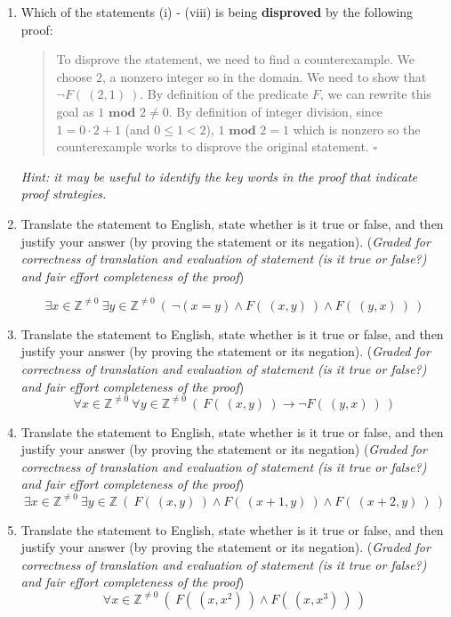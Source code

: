 \begin{enumerate}[labelindent=0pt, leftmargin=0pt]
\begin{enumerate}
    \item
    Which of the statements (i) - (viii) is being {\bf disproved} by the following proof:
    
    \begin{quote}
      To disprove the statement, we need to find a counterexample. We choose $2$, a nonzero
      integer so in the domain. We need to show that $\lnot F(~(2,1)~)$. By definition of the predicate $F$, we 
      can rewrite this goal as $1 \textbf{ mod } 2 \neq 0$. By definition of integer division, since 
      $1 = 0 \cdot 2  + 1$ (and $0 \leq 1 < 2$), $1 \textbf { mod } 2 = 1$ which is nonzero so the counterexample works to 
      disprove the original statement.
       $\square$
    \end{quote}
    
    {\it Hint: it may be useful to 
    identify the key words in the proof that indicate proof strategies.}
    
    \item 
    Translate the statement to English, state whether is it true or false, and then justify your answer (by proving the statement or its negation).
({\it Graded for correctness of translation and evaluation of statement (is it true or false?) 
    and fair effort completeness of the proof}) 

    $$\exists x \in \mathbb{Z}^{\neq 0}~ \exists y \in \mathbb{Z}^{\neq 0} ~(~\lnot(x = y) \land F(~(x,y)~) \land F(~(y,x)~)~)$$
    
    \item 
    Translate the statement to English, state whether is it true or false, and then justify your answer (by proving the statement or its negation).
    ({\it Graded for correctness of translation and evaluation of statement (is it true or false?) 
    and fair effort completeness of the proof}) 
    $$\forall x \in \mathbb{Z}^{\neq 0}~ \forall y \in \mathbb{Z}^{\neq 0} ~(~F(~(x,y)~) \to \lnot F(~(y,x)~)~)$$
    
    \item 
    Translate the statement to English, state whether is it true or false, and then justify your answer (by proving the statement or its negation)
    ({\it Graded for correctness of translation and evaluation of statement (is it true or false?) 
    and fair effort completeness of the proof}) 
    $$\exists x \in \mathbb{Z}^{\neq 0}~ \exists y \in \mathbb{Z}~(~F(~(x,y)~) \land  F(~(x+1, y)~) \land F(~(x+2, y)~)~)$$
    
    \item 
    Translate the statement to English, state whether is it true or false, and then justify your answer (by proving the statement or its negation).
    ({\it Graded for correctness of translation and evaluation of statement (is it true or false?) 
    and fair effort completeness of the proof}) 
    $$\forall x \in \mathbb{Z}^{\neq 0}~ (~F(~(x,x^2)~) \land F(~(x,x^3)~)~)$$
    

\end{enumerate}
\end{enumerate}
